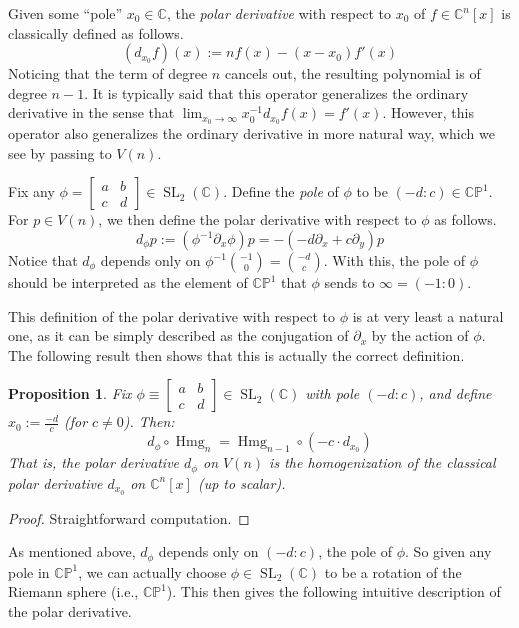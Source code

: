 \documentclass{article}
\newtheorem{proposition}[theorem]{Proposition}
\theoremstyle{definition}
\theoremstyle{plain}
\newcommand{\C}{\mathbb{C}}
\newcommand{\CP}{\mathbb{CP}}
\DeclareMathOperator{\Hmg}{Hmg}
\DeclareMathOperator{\SL}{SL}
\begin{document}
Given some ``pole'' $x_0 \in \C$, the \emph{polar derivative} with respect to $x_0$ of $f \in \C^n[x]$ is classically defined as follows.
\[
    (d_{x_0}f)(x) := nf(x) - (x-x_0)f'(x)
\]
Noticing that the term of degree $n$ cancels out, the resulting polynomial is of degree $n-1$. It is typically said that this operator generalizes the ordinary derivative in the sense that $\lim_{x_0 \rightarrow \infty} x_0^{-1}d_{x_0}f(x) = f'(x)$. However, this operator also generalizes the ordinary derivative in more natural way, which we see by passing to $V(n)$.

Fix any $\phi = \begin{bmatrix} a & b \\ c & d \end{bmatrix} \in \SL_2(\C)$. Define the \emph{pole} of $\phi$ to be $(-d:c) \in \CP^1$. For $p \in V(n)$, we then define the polar derivative with respect to $\phi$ as follows.
\[
    d_\phi p := (\phi^{-1}\partial_x\phi)p = -(-d\partial_x + c\partial_y)p
\]
Notice that $d_\phi$ depends only on $\phi^{-1}\binom{-1}{0} = \binom{-d}{c}$. With this, the pole of $\phi$ should be interpreted as the element of $\CP^1$ that $\phi$ sends to $\infty = (-1:0)$.

This definition of the polar derivative with respect to $\phi$ is at very least a natural one, as it can be simply described as the conjugation of $\partial_x$ by the action of $\phi$. The following result then shows that this is actually the correct definition.

\begin{proposition}
Fix $\phi \equiv \begin{bmatrix} a & b \\ c & d \end{bmatrix} \in \SL_2(\C)$ with pole $(-d:c)$, and define $x_0 := \frac{-d}{c}$ (for $c \neq 0$). Then:
\[
    d_\phi \circ \Hmg_n = \Hmg_{n-1} \circ (-c \cdot d_{x_0})
\]
That is, the polar derivative $d_\phi$ on $V(n)$ is the homogenization of the classical polar derivative $d_{x_0}$ on $\C^n[x]$ (up to scalar).
\end{proposition}
\begin{proof}
    Straightforward computation.
\end{proof}

As mentioned above, $d_\phi$ depends only on $(-d:c)$, the pole of $\phi$. So given any pole in $\CP^1$, we can actually choose $\phi \in \SL_2(\C)$ to be a rotation of the Riemann sphere (i.e., $\CP^1$). This then gives the following intuitive description of the polar derivative.
\end{document}
